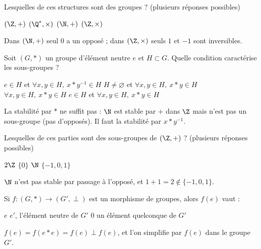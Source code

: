 
\begin{question}
Lesquelles de ces structures sont des groupes ? (plusieurs réponses possibles)
\begin{reponses}
  \bonne $(\Z,+)$
  \bonne $(\Q^*,\times)$
  \mauvaise $(\N,+)$
  \mauvaise $(\Z,\times)$
\end{reponses}
\begin{explication}
Dans $(\N,+)$ seul $0$ a un opposé ; dans $(\Z,\times)$ seuls $1$ et $-1$ sont inversibles.
\end{explication}
\end{question}

\begin{question}
Soit $(G,*)$ un groupe d'élément neutre $e$ et $H\subset G$. Quelle condition caractérise les sous-groupes ?
\begin{reponses}
  \bonne $e\in H$ et $\forall x,y\in H,\ x*y^{-1}\in H$
  \mauvaise $H\neq\varnothing$ et $\forall x,y\in H,\ x*y\in H$
  \mauvaise $\forall x,y\in H,\ x*y\in H$
  \mauvaise $e\in H$ et $\forall x,y\in H,\ x*y\in H$
\end{reponses}
\begin{explication}
La stabilité par $*$ ne suffit pas : $\N$ est stable par $+$ dans $\Z$ mais n'est pas un sous-groupe (pas d'opposés). Il faut la stabilité par $x*y^{-1}$.
\end{explication}
\end{question}

\begin{question}
Lesquelles de ces parties sont des sous-groupes de $(\Z,+)$ ? (plusieurs réponses possibles)
\begin{reponses}
  \bonne $2\Z$
  \bonne $\{0\}$
  \mauvaise $\N$
  \mauvaise $\{-1,0,1\}$
\end{reponses}
\begin{explication}
$\N$ n'est pas stable par passage à l'opposé, et $1+1=2\notin\{-1,0,1\}$.
\end{explication}
\end{question}

\begin{question}
Si $f:(G,*)\to(G',\perp)$ est un morphisme de groupes, alors $f(e)$ vaut :
\begin{reponses}
  \mauvaise $e$
  \bonne $e'$, l'élément neutre de $G'$
  \mauvaise $0$
  \mauvaise un élément quelconque de $G'$
\end{reponses}
\begin{explication}
$f(e)=f(e*e)=f(e)\perp f(e)$, et l'on simplifie par $f(e)$ dans le groupe $G'$.
\end{explication}
\end{question}

